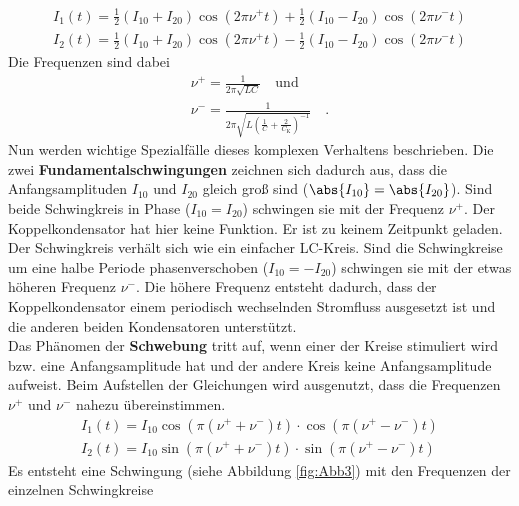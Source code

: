 \begin{align}
I_1(t) = \frac{1}{2}(I_{10} + I_{20}) \cos(2 \pi \nu^+ t) + \frac{1}{2}(I_{10} - I_{20}) \cos(2 \pi \nu^- t) \\
I_2(t) = \frac{1}{2}(I_{10} + I_{20}) \cos(2 \pi \nu^+ t) - \frac{1}{2}(I_{10} - I_{20}) \cos(2 \pi \nu^- t)
\end{align}
Die Frequenzen sind dabei
\begin{align}
\nu^+ = \frac{1}{2 \pi \sqrt{L C}} \quad \text{und} \label{Frequenz_p} \\
\nu^- = \frac{1}{2 \pi \sqrt{L\left(\frac{1}{C} + \frac{2}{C_\text{K}}\right)^{-1}}} \quad . \label{Frequenz_m}
\end{align}
Nun werden wichtige Spezialfälle dieses komplexen Verhaltens beschrieben. Die zwei \textbf{Fundamentalschwingungen} zeichnen sich dadurch aus, dass die Anfangsamplituden $I_{10}$ und $I_{20}$ gleich groß sind ($\abs{I_{10}} = \abs{I_{20}}$). Sind beide Schwingkreis in Phase ($I_{10}=I_{20}$) schwingen sie mit der Frequenz $\nu^+$. Der Koppelkondensator hat hier keine Funktion. Er ist zu keinem Zeitpunkt geladen. Der Schwingkreis verhält sich wie ein einfacher LC-Kreis. Sind die Schwingkreise um eine halbe Periode phasenverschoben ($I_{10} = - I_{20}$) schwingen sie mit der etwas höheren Frequenz $\nu^-$. Die höhere Frequenz entsteht dadurch, dass der Koppelkondensator einem periodisch wechselnden Stromfluss ausgesetzt ist und die anderen beiden Kondensatoren unterstützt. \\
Das Phänomen der \textbf{Schwebung} tritt auf, wenn einer der Kreise stimuliert wird bzw. eine Anfangsamplitude hat und der andere Kreis keine Anfangsamplitude aufweist. Beim Aufstellen der Gleichungen wird ausgenutzt, dass die Frequenzen $\nu^+$ und $\nu^-$ nahezu übereinstimmen.
\begin{align}\label{Schwebung}
	I_1(t) = I_{10}  \cos \left( \pi (\nu^+ + \nu^-) t \right) \cdot  \cos \left( \pi (\nu^+ - \nu^-) t \right) \\
	I_2 (t) = I_{10}  \sin \left( \pi (\nu^+ + \nu^-) t \right) \cdot  \sin \left( \pi (\nu^+ - \nu^-) t \right) 
\end{align}
Es entsteht eine Schwingung (siehe Abbildung \ref{fig:Abb3})  mit den Frequenzen der einzelnen Schwingkreise
